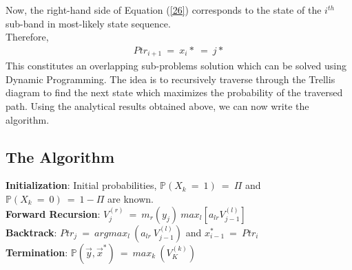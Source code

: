 \documentclass[12pt, draftcls, onecolumn]{IEEEtran}
\begin{document}
Now, the right-hand side of Equation (\ref{26}) corresponds to the state of the $i^{th}$ sub-band in most-likely state sequence.
\\Therefore,
\begin{equation}\label{27}
    \begin{aligned}
        Ptr_{i+1}\ =\ x_i*\ =\ j*
    \end{aligned}
\end{equation}
This constitutes an overlapping sub-problems solution which can be solved using Dynamic Programming. The idea is to recursively traverse through the Trellis diagram to find the next state which maximizes the probability of the traversed path. Using the analytical results obtained above, we can now write the algorithm.
\subsection{The Algorithm}
\begin{flushleft}
\textbf{Initialization}: Initial probabilities, $\mathbb{P}(X_k\ =\ 1)\ =\ \Pi$ and $\mathbb{P}(X_k\ =\ 0)\ =\ 1-\Pi$ are known.
\\\textbf{Forward Recursion}: $V_j^{(r)}\ =\ m_r(y_j)\ max_{l}[a_{lr}V_{j-1}^{(l)}]$
\\\textbf{Backtrack}: $Ptr_j\ =\ argmax_l\ (a_{lr}\ V_{j-1}^{(l)})$ and $x_{i-1}^*\ =\ Ptr_{i}$
\\\textbf{Termination}: $\mathbb P(\vec{y},\vec{x}^*)\ =\ max_k\ (V_K^{(k)})$
\end{flushleft}
\end{document}
